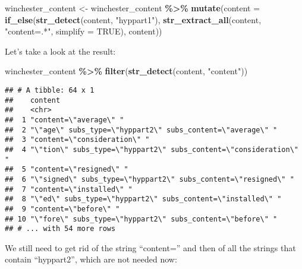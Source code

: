 \documentclass[
]{article}
\newenvironment{Shaded}{\begin{snugshade}}{\end{snugshade}}
\newcommand{\DataTypeTok}[1]{\textcolor[rgb]{0.13,0.29,0.53}{#1}}
\newcommand{\KeywordTok}[1]{\textcolor[rgb]{0.13,0.29,0.53}{\textbf{#1}}}
\newcommand{\NormalTok}[1]{#1}
\newcommand{\OperatorTok}[1]{\textcolor[rgb]{0.81,0.36,0.00}{\textbf{#1}}}
\newcommand{\OtherTok}[1]{\textcolor[rgb]{0.56,0.35,0.01}{#1}}
\newcommand{\StringTok}[1]{\textcolor[rgb]{0.31,0.60,0.02}{#1}}
\begin{document}
\begin{Shaded}
\begin{Highlighting}[]
\NormalTok{winchester\_content \textless{}{-}}\StringTok{ }\NormalTok{winchester\_content }\OperatorTok{\%\textgreater{}\%}\StringTok{ }
\StringTok{  }\KeywordTok{mutate}\NormalTok{(}\DataTypeTok{content =} \KeywordTok{if\_else}\NormalTok{(}\KeywordTok{str\_detect}\NormalTok{(content, }\StringTok{"hyppart1"}\NormalTok{), }
                           \KeywordTok{str\_extract\_all}\NormalTok{(content, }\StringTok{"content=.*"}\NormalTok{, }\DataTypeTok{simplify =} \OtherTok{TRUE}\NormalTok{), }
\NormalTok{                           content))}
\end{Highlighting}
\end{Shaded}

Let's take a look at the result:

\begin{Shaded}
\begin{Highlighting}[]
\NormalTok{winchester\_content }\OperatorTok{\%\textgreater{}\%}\StringTok{ }
\StringTok{  }\KeywordTok{filter}\NormalTok{(}\KeywordTok{str\_detect}\NormalTok{(content, }\StringTok{"content"}\NormalTok{))}
\end{Highlighting}
\end{Shaded}

\begin{verbatim}
## # A tibble: 64 x 1
##    content                                                          
##    <chr>                                                            
##  1 "content=\"average\" "                                           
##  2 "\"age\" subs_type=\"hyppart2\" subs_content=\"average\" "       
##  3 "content=\"consideration\" "                                     
##  4 "\"tion\" subs_type=\"hyppart2\" subs_content=\"consideration\" "
##  5 "content=\"resigned\" "                                          
##  6 "\"signed\" subs_type=\"hyppart2\" subs_content=\"resigned\" "   
##  7 "content=\"installed\" "                                         
##  8 "\"ed\" subs_type=\"hyppart2\" subs_content=\"installed\" "      
##  9 "content=\"before\" "                                            
## 10 "\"fore\" subs_type=\"hyppart2\" subs_content=\"before\" "       
## # ... with 54 more rows
\end{verbatim}

We still need to get rid of the string ``content='' and then of all the strings that contain ``hyppart2'',
which are not needed now:
\end{document}
